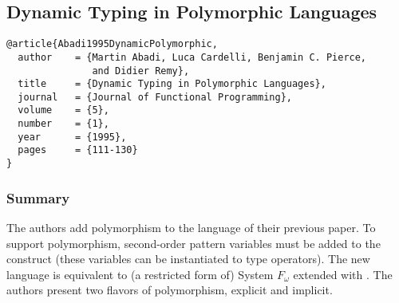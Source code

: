 \documentclass[letterpaper]{llncs}
\begin{document}






\subsection*{Dynamic Typing in Polymorphic Languages}%

\begin{verbatim}
@article{Abadi1995DynamicPolymorphic,
  author    = {Martin Abadi, Luca Cardelli, Benjamin C. Pierce, 
               and Didier Remy},
  title     = {Dynamic Typing in Polymorphic Languages},
  journal   = {Journal of Functional Programming},
  volume    = {5},
  number    = {1},
  year      = {1995},
  pages     = {111-130}
}
\end{verbatim}


\subsubsection*{Summary}
The authors add polymorphism to the language of their previous paper. To support polymorphism, second-order pattern variables must be added to the \typecase construct (these variables can be instantiated to type operators). The new language is equivalent to (a restricted form of) System $F_\omega$ extended with \Dynamic. The authors present two flavors of polymorphism, explicit and implicit.
\end{document}
